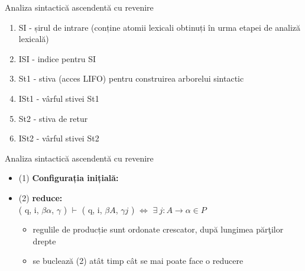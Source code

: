 \documentclass[pdf]{beamer}
\newcommand{\tab}[1]{\hspace{.2\textwidth}\rlap{#1}}
\begin{document}
\begin{frame}{Analiza sintactică ascendentă cu revenire}
\begin{enumerate}
\item 
SI - șirul de intrare (conține atomii lexicali obtinuți în urma etapei de analiză lexicală)

\item 
ISI - indice pentru SI

\item 
St1 - stiva (acces LIFO) pentru construirea arborelui sintactic

\item 
ISt1 - vârful stivei St1

\item 
St2 - stiva de retur

\item 
ISt2 - vârful stivei St2
\end{enumerate}  
\end{frame}



\begin{frame}{Analiza sintactică ascendentă cu revenire}
\begin{itemize}
\item{(1)}
\textbf{Configurația inițială:}

      \tab{( q,0,\$,$\epsilon$ )}
\item{(2)}	
\textbf{reduce:}\\
      ( q, i, $\beta \alpha$, $\gamma$ ) $\vdash$ ( q, i, $\beta A$, $\gamma j$ ) $\Leftrightarrow$ \textbf{$\exists \ j: A \rightarrow \alpha \in P$}
\begin{itemize}
\item
regulile de producție sunt ordonate crescator, după lungimea părţilor drepte

\item
se buclează (2) atât timp cât se mai poate face o reducere
\end{itemize}
\end{itemize}
\end{frame}
\end{document}
